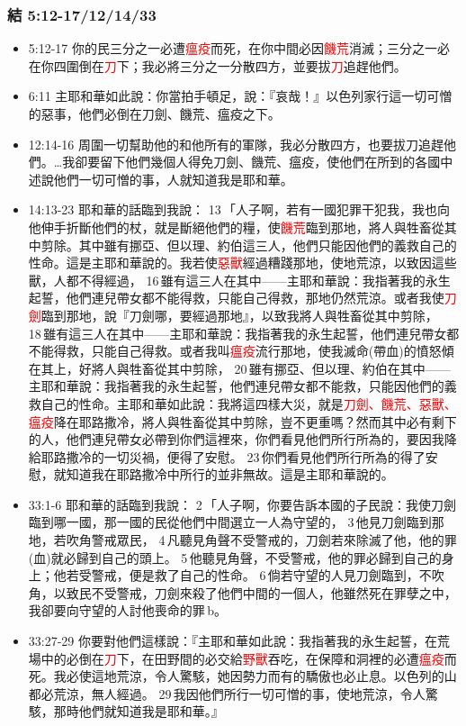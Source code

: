 \subsubsection{結 5:12-17/12/14/33}
\begin{itemize}
\item 5:12-17 你的民三分之一必遭\textcolor{red}{瘟疫}而死，在你中間必因\textcolor{red}{饑荒}消滅；三分之一必在你四圍倒在\textcolor{red}{刀}下；我必將三分之一分散四方，並要拔\textcolor{red}{刀}追趕他們。

\item 6:11 主耶和華如此說：你當拍手頓足，說：『哀哉！』以色列家行這一切可憎的惡事，他們必倒在刀劍、饑荒、瘟疫之下。

\item 12:14-16 周圍一切幫助他的和他所有的軍隊，我必分散四方，也要拔刀追趕他們。…我卻要留下他們幾個人得免刀劍、饑荒、瘟疫，使他們在所到的各國中述說他們一切可憎的事，人就知道我是耶和華。

\item 14:13-23 耶和華的話臨到我說： 13 「人子啊，若有一國犯罪干犯我，我也向他伸手折斷他們的杖，就是斷絕他們的糧，使\textcolor{red}{饑荒}臨到那地，將人與牲畜從其中剪除。其中雖有挪亞、但以理、約伯這三人，他們只能因他們的義救自己的性命。這是主耶和華說的。我若使\textcolor{red}{惡獸}經過糟踐那地，使地荒涼，以致因這些獸，人都不得經過， 16 雖有這三人在其中——主耶和華說：我指著我的永生起誓，他們連兒帶女都不能得救，只能自己得救，那地仍然荒涼。或者我使\textcolor{red}{刀劍}臨到那地，說『刀劍哪，要經過那地』，以致我將人與牲畜從其中剪除， 18 雖有這三人在其中——主耶和華說：我指著我的永生起誓，他們連兒帶女都不能得救，只能自己得救。或者我叫\textcolor{red}{瘟疫}流行那地，使我滅命(帶血)的憤怒傾在其上，好將人與牲畜從其中剪除， 20 雖有挪亞、但以理、約伯在其中——主耶和華說：我指著我的永生起誓，他們連兒帶女都不能救，只能因他們的義救自己的性命。主耶和華如此說：我將這四樣大災，就是\textcolor{red}{刀劍、饑荒、惡獸、瘟疫}降在耶路撒冷，將人與牲畜從其中剪除，豈不更重嗎？然而其中必有剩下的人，他們連兒帶女必帶到你們這裡來，你們看見他們所行所為的，要因我降給耶路撒冷的一切災禍，便得了安慰。 23 你們看見他們所行所為的得了安慰，就知道我在耶路撒冷中所行的並非無故。這是主耶和華說的。


\item 33:1-6 耶和華的話臨到我說： 2 「人子啊，你要告訴本國的子民說：我使刀劍臨到哪一國，那一國的民從他們中間選立一人為守望的， 3 他見刀劍臨到那地，若吹角警戒眾民， 4 凡聽見角聲不受警戒的，刀劍若來除滅了他，他的罪(血)就必歸到自己的頭上。 5 他聽見角聲，不受警戒，他的罪必歸到自己的身上；他若受警戒，便是救了自己的性命。 6 倘若守望的人見刀劍臨到，不吹角，以致民不受警戒，刀劍來殺了他們中間的一個人，他雖然死在罪孽之中，我卻要向守望的人討他喪命的罪 b。

\item 33:27-29 你要對他們這樣說：『主耶和華如此說：我指著我的永生起誓，在荒場中的必倒在\textcolor{red}{刀}下，在田野間的必交給\textcolor{red}{野獸}吞吃，在保障和洞裡的必遭\textcolor{red}{瘟疫}而死。我必使這地荒涼，令人驚駭，她因勢力而有的驕傲也必止息。以色列的山都必荒涼，無人經過。 29 我因他們所行一切可憎的事，使地荒涼，令人驚駭，那時他們就知道我是耶和華。』


\end{itemize}


